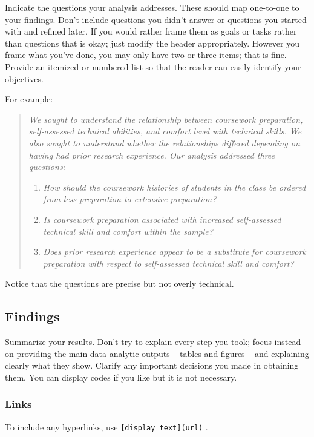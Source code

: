 \documentclass[
  letterpaper,
  DIV=11,
  numbers=noendperiod]{scrartcl}
\providecommand{\tightlist}{%
  \setlength{\itemsep}{0pt}\setlength{\parskip}{0pt}}
\begin{document}
Indicate the questions your analysis addresses. These should map
one-to-one to your findings. Don't include questions you didn't answer
or questions you started with and refined later. If you would rather
frame them as goals or tasks rather than questions that is okay; just
modify the header appropriately. However you frame what you've done, you
may only have two or three items; that is fine. Provide an itemized or
numbered list so that the reader can easily identify your objectives.

For example:

\begin{quote}
\emph{We sought to understand the relationship between coursework
preparation, self-assessed technical abilities, and comfort level with
technical skills. We also sought to understand whether the relationships
differed depending on having had prior research experience. Our analysis
addressed three questions:}

\begin{enumerate}
\def\labelenumi{\arabic{enumi}.}
\tightlist
\item
  \emph{How should the coursework histories of students in the class be
  ordered from less preparation to extensive preparation?}
\item
  \emph{Is coursework preparation associated with increased
  self-assessed technical skill and comfort within the sample?}
\item
  \emph{Does prior research experience appear to be a substitute for
  coursework preparation with respect to self-assessed technical skill
  and comfort?}
\end{enumerate}
\end{quote}

Notice that the questions are precise but not overly technical.

\subsection{Findings}\label{findings}

Summarize your results. Don't try to explain every step you took; focus
instead on providing the main data analytic outputs -- tables and
figures -- and explaining clearly what they show. Clarify any important
decisions you made in obtaining them. You can display codes if you like
but it is not necessary.

\subsubsection{Links}\label{links}

To include any hyperlinks, use \texttt{{[}display\ text{]}(url)} .
\end{document}
